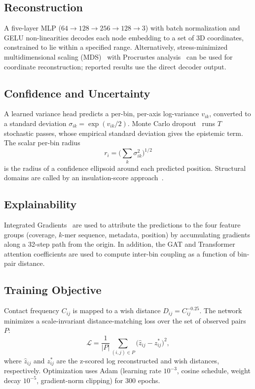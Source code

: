 \documentclass[conference]{IEEEtran}
\begin{document}
\subsection{Reconstruction}
A five-layer MLP ($64 \rightarrow 128 \rightarrow 256 \rightarrow 128
\rightarrow 3$) with batch normalization and GELU non-linearities
decodes each node embedding to a set of 3D coordinates, constrained to
lie within a specified range. Alternatively, stress-minimized
multidimensional scaling (MDS)~\cite{borg2005} with Procrustes
analysis~\cite{gower1975} can be used for coordinate reconstruction;
reported results use the direct decoder output.

\subsection{Confidence and Uncertainty}
A learned variance head predicts a per-bin, per-axis log-variance
$v_{ik}$, converted to a standard deviation
$\sigma_{ik} = \exp(v_{ik}/2)$. Monte Carlo dropout~\cite{gal2016} runs
$T$ stochastic passes, whose empirical standard deviation gives the
epistemic term. The scalar per-bin radius
\begin{equation}
r_i = \Big( \textstyle\sum_{k} \sigma_{ik}^{2} \Big)^{1/2}
\end{equation}
is the radius of a confidence ellipsoid around each predicted position.
Structural domains are called by an insulation-score
approach~\cite{crane2015}.

\subsection{Explainability}
Integrated Gradients~\cite{sundararajan2017} are used to attribute the
predictions to the four feature groups (coverage, $k$-mer sequence,
metadata, position) by accumulating gradients along a 32-step path from
the origin. In addition, the GAT and Transformer attention coefficients
are used to compute inter-bin coupling as a function of bin-pair
distance.

\subsection{Training Objective}
Contact frequency $C_{ij}$ is mapped to a wish distance
$D_{ij} = C_{ij}^{-0.25}$. The network minimizes a scale-invariant
distance-matching loss over the set of observed pairs $P$:
\begin{equation}
\mathcal{L} = \frac{1}{|P|} \sum_{(i,j) \in P}
\big( \hat{z}_{ij} - z^{*}_{ij} \big)^{2},
\end{equation}
where $\hat{z}_{ij}$ and $z^{*}_{ij}$ are the z-scored log reconstructed
and wish distances, respectively. Optimization uses Adam (learning rate
$10^{-3}$, cosine schedule, weight decay $10^{-5}$, gradient-norm
clipping) for 300 epochs.
\end{document}

